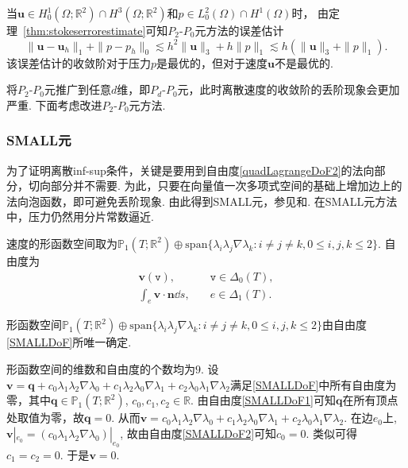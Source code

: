 当$\boldsymbol{u}\in H_0^1(\Omega;\mathbb R^2)\cap H^3(\Omega;\mathbb R^2)$和$p\in L_0^2(\Omega)\cap H^1(\Omega)$时， 由定理~\ref{thm:stokeserrorestimate}可知$P_2$-$P_0$元方法的误差估计
\begin{equation*}
\|\boldsymbol{u}-\boldsymbol{u}_h\|_{1} + \|p-p_h\|_{0}
\lesssim h^2\|\boldsymbol{u}\|_3+h\|p\|_1\lesssim h(\|\boldsymbol{u}\|_3+\|p\|_1).
\end{equation*}
该误差估计的收敛阶对于压力$p$是最优的，但对于速度$\boldsymbol{u}$不是最优的.

将$P_2$-$P_0$元推广到任意$d$维，即$P_d$-$P_0$元，此时离散速度的收敛阶的丢阶现象会更加严重.
下面考虑改进$P_2$-$P_0$元方法.

\subsubsection{SMALL元}

为了证明离散inf-sup条件，关键是要用到自由度\eqref{quadLagrangeDoF2}的法向部分，切向部分并不需要. 为此，只要在向量值一次多项式空间的基础上增加边上的法向泡函数，即可避免丢阶现象. 由此得到SMALL元，参见\cite[Remark 8.4.2]{BoffiBrezziFortin2013}和\cite{BernardiRaugel1981,Fortin1981}. 在SMALL元方法中，压力仍然用分片常数逼近.


速度的形函数空间取为$\mathbb P_1(T;\mathbb R^2)\oplus\mathrm{span}\{\lambda_i\lambda_j\nabla\lambda_k: i\neq j\neq k, 0\leq i,j,k\leq2\}$. %
自由度为
\begin{subequations}\label{SMALLDoF}
\begin{align}
\label{SMALLDoF1}
\boldsymbol{v}(\texttt{v}), &\quad \texttt{v}\in\Delta_0(T), \\
\label{SMALLDoF2}
\int_{e}\boldsymbol{v}\cdot\boldsymbol{n}\dd s, &\quad e\in\Delta_1(T).
\end{align}
\end{subequations}

\begin{lemma}
形函数空间$\mathbb P_1(T;\mathbb R^2)\oplus\mathrm{span}\{\lambda_i\lambda_j\nabla\lambda_k: i\neq j\neq k, 0\leq i,j,k\leq2\}$由自由度\eqref{SMALLDoF}所唯一确定.
\end{lemma}
\begin{prf}
形函数空间的维数和自由度的个数均为$9$. 设$\boldsymbol{v}=\boldsymbol{q}+c_0\lambda_1\lambda_2\nabla\lambda_0+c_1\lambda_2\lambda_0\nabla\lambda_1+c_2\lambda_0\lambda_1\nabla\lambda_2$满足\eqref{SMALLDoF}中所有自由度为零，其中$\boldsymbol{q}\in\mathbb P_1(T;\mathbb R^2)$, $c_0,c_1,c_2\in\mathbb R$. 由自由度\eqref{SMALLDoF1}可知$\boldsymbol{q}$在所有顶点处取值为零，故$\boldsymbol{q}=0$. 从而$\boldsymbol{v}=c_0\lambda_1\lambda_2\nabla\lambda_0+c_1\lambda_2\lambda_0\nabla\lambda_1+c_2\lambda_0\lambda_1\nabla\lambda_2$. 在边$e_0$上, $\boldsymbol{v}|_{e_0}=(c_0\lambda_1\lambda_2\nabla\lambda_0)|_{e_0}$, 故由自由度\eqref{SMALLDoF2}可知$c_0=0$. 类似可得$c_1=c_2=0$. 于是$\boldsymbol{v}=0$.
\end{prf}

